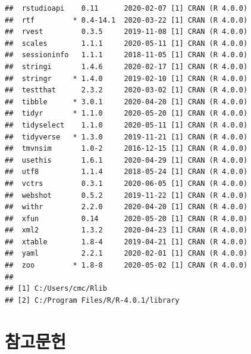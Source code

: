 \documentclass[
  10pt,
]{krantz}
\begin{document}
\begin{verbatim}
##  rstudioapi    0.11      2020-02-07 [1] CRAN (R 4.0.0)                   
##  rtf         * 0.4-14.1  2020-03-22 [1] CRAN (R 4.0.0)                   
##  rvest         0.3.5     2019-11-08 [1] CRAN (R 4.0.0)                   
##  scales        1.1.1     2020-05-11 [1] CRAN (R 4.0.0)                   
##  sessioninfo   1.1.1     2018-11-05 [1] CRAN (R 4.0.0)                   
##  stringi       1.4.6     2020-02-17 [1] CRAN (R 4.0.0)                   
##  stringr     * 1.4.0     2019-02-10 [1] CRAN (R 4.0.0)                   
##  testthat      2.3.2     2020-03-02 [1] CRAN (R 4.0.0)                   
##  tibble      * 3.0.1     2020-04-20 [1] CRAN (R 4.0.0)                   
##  tidyr       * 1.1.0     2020-05-20 [1] CRAN (R 4.0.0)                   
##  tidyselect    1.1.0     2020-05-11 [1] CRAN (R 4.0.0)                   
##  tidyverse   * 1.3.0     2019-11-21 [1] CRAN (R 4.0.0)                   
##  tmvnsim       1.0-2     2016-12-15 [1] CRAN (R 4.0.0)                   
##  usethis       1.6.1     2020-04-29 [1] CRAN (R 4.0.0)                   
##  utf8          1.1.4     2018-05-24 [1] CRAN (R 4.0.0)                   
##  vctrs         0.3.1     2020-06-05 [1] CRAN (R 4.0.0)                   
##  webshot       0.5.2     2019-11-22 [1] CRAN (R 4.0.0)                   
##  withr         2.2.0     2020-04-20 [1] CRAN (R 4.0.0)                   
##  xfun          0.14      2020-05-20 [1] CRAN (R 4.0.0)                   
##  xml2          1.3.2     2020-04-23 [1] CRAN (R 4.0.0)                   
##  xtable        1.8-4     2019-04-21 [1] CRAN (R 4.0.0)                   
##  yaml          2.2.1     2020-02-01 [1] CRAN (R 4.0.0)                   
##  zoo         * 1.8-8     2020-05-02 [1] CRAN (R 4.0.0)                   
## 
## [1] C:/Users/cmc/Rlib
## [2] C:/Program Files/R/R-4.0.1/library
\end{verbatim}

\hypertarget{uxcc38uxace0uxbb38uxd5cc}{%
\chapter*{참고문헌}\label{uxcc38uxace0uxbb38uxd5cc}}


  

\backmatter
\printindex
\end{document}
